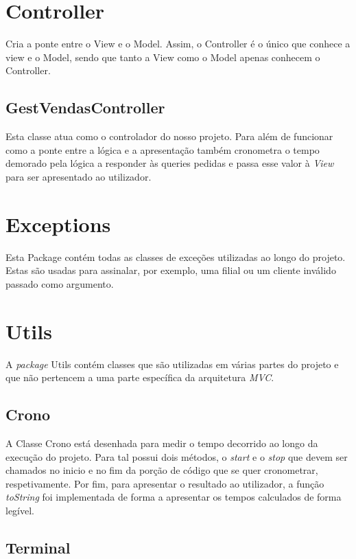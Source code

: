 \documentclass[a4paper]{report}
\begin{document}
\section{Controller}

Cria a ponte entre o View e o Model. Assim, o Controller é o único que conhece a view e o
Model, sendo que tanto a View como o Model apenas conhecem o Controller.

\subsection{GestVendasController}

Esta classe atua como o controlador do nosso projeto. Para além de funcionar como a ponte entre
a lógica e a apresentação também cronometra o tempo demorado pela lógica a responder às queries pedidas
e passa esse valor à \textit{View} para ser apresentado ao utilizador.

\section{Exceptions}

Esta Package contém todas as classes de exceções utilizadas ao longo do projeto.
Estas são usadas para assinalar, por exemplo, uma filial ou um cliente inválido passado
como argumento.

\pagebreak

\section{Utils}

A \textit{package} Utils contém classes que são utilizadas em várias partes do projeto e que não
pertencem a uma parte específica da arquitetura \textit{MVC}.

\subsection{Crono}

A Classe Crono está desenhada para medir o tempo decorrido ao longo da execução do projeto.
Para tal possui dois métodos, o \textit{start} e o \textit{stop} que devem ser chamados no
inicio e no fim da porção de código que se quer cronometrar, respetivamente.
Por fim, para apresentar o resultado ao utilizador, a função \textit{toString} foi implementada
de forma a apresentar os tempos calculados de forma legível.

\subsection{Terminal}
\end{document}
